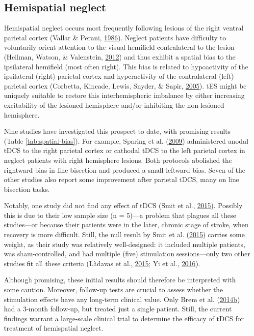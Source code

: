 \documentclass[11pt,]{memoir}
\begin{document}
\hypertarget{hemispatial-neglect}{%
\subsection{Hemispatial neglect}\label{hemispatial-neglect}}

Hemispatial neglect occurs most frequently following lesions of the right ventral parietal cortex (Vallar \& Perani, \protect\hyperlink{ref-Vallar1986}{1986}). Neglect patients have difficulty to voluntarily orient attention to the visual hemifield contralateral to the lesion (Heilman, Watson, \& Valenstein, \protect\hyperlink{ref-Heilman2012}{2012}) and thus exhibit a spatial bias to the ipsilateral hemifield (most often right). This bias is related to hypoactivity of the ipsilateral (right) parietal cortex and hyperactivity of the contralateral (left) parietal cortex (Corbetta, Kincade, Lewis, Snyder, \& Sapir, \protect\hyperlink{ref-Corbetta2005}{2005}). tES might be uniquely suitable to restore this interhemispheric imbalance by either increasing excitability of the lesioned hemisphere and/or inhibiting the non-lesioned hemisphere.

Nine studies have investigated this prospect to date, with promising results (Table \ref{tab:spatial-bias}). For example, Sparing et al. (\protect\hyperlink{ref-Sparing2009}{2009}) administered anodal tDCS to the right parietal cortex or cathodal tDCS to the left parietal cortex in neglect patients with right hemisphere lesions. Both protocols abolished the rightward bias in line bisection and produced a small leftward bias. Seven of the other studies also report some improvement after parietal tDCS, many on line bisection tasks.

Notably, one study did not find any effect of tDCS (Smit et al., \protect\hyperlink{ref-Smit2015}{2015}). Possibly this is due to their low sample size (n = 5)---a problem that plagues all these studies---or because their patients were in the later, chronic stage of stroke, when recovery is more difficult. Still, the null result by Smit et al. (\protect\hyperlink{ref-Smit2015}{2015}) carries some weight, as their study was relatively well-designed: it included multiple patients, was sham-controlled, and had multiple (five) stimulation sessions---only two other studies fit all these criteria (Làdavas et al., \protect\hyperlink{ref-Ladavas2015}{2015}; Yi et al., \protect\hyperlink{ref-Yi2016}{2016}).

Although promising, these initial results should therefore be interpreted with some caution. Moreover, follow-up tests are crucial to assess whether the stimulation effects have any long-term clinical value. Only Brem et al. (\protect\hyperlink{ref-Brem2014}{2014}\protect\hyperlink{ref-Brem2014}{b}) had a 3-month follow-up, but treated just a single patient. Still, the current findings warrant a large-scale clinical trial to determine the efficacy of tDCS for treatment of hemispatial neglect.
\end{document}
